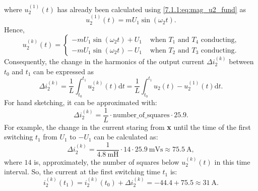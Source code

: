 \begin{solutionblock}
    where $u^{(1)}_\mathrm{2}(t)$ has already been calculated using \eqref{7.1.1:eq:mag_u2_fund} as
    \begin{equation}
        u^{(1)}_\mathrm{2}(t) = m U_{\mathrm{1}} \sin(\omega_2 t).         
    \end{equation}
    Hence,
    \begin{equation}
        u^{(k)}_\mathrm{2}(t) =  \begin{cases}
            - m U_{\mathrm{1}} \sin(\omega_2 t) + U_{\mathrm{1}} &\text{ when $T_1$ and $T_4$ conducting,}\\
            - m U_{\mathrm{1}} \sin(\omega_2 t)  - U_{\mathrm{1}} &\text{ when $T_2$ and $T_3$ conducting}.
            \end{cases}
        \label{7.1.2:eq:u_2_harm_cases}         
    \end{equation}
    Consequently, the change in the harmonics of the output current $\Delta i^{(k)}_\mathrm{2}$ between $t_0$ and $t_1$ can be expressed as 
    \begin{equation}
        \Delta i^{(k)}_\mathrm{2} = \frac{1}{L} \int_{t_0}^{t_1} u^{(k)}_\mathrm{2}(t) \mathrm{d}t = \frac{1}{L} \int_{t_0}^{t_1} u_\mathrm{2}(t) - u^{(1)}_\mathrm{2}(t) \mathrm{d}t.
        \label{7.1.2:eq:i_2_harm}         
    \end{equation}
    For hand sketching, it can be approximated with:
        \begin{equation}
            \Delta i^{(k)}_\mathrm{2} = \frac{1}{L} \cdot \text{number\_of\_squares} \cdot 25.9.
            \label{7.1.2:eq:approx_i_2_harm}         
        \end{equation}
        For example, the change in the current staring from \textbf{x} until the time of the first switching $t_1$ from $U_1$ to $-U_1$ can be calculated as:
        \begin{equation}
            \Delta i^{(k)}_\mathrm{2} = \frac{1}{\SI{4.8}{\milli \henry}} \cdot 14 \cdot \SI{25.9}{\milli \volt \second} \approx \SI{75.5}{\ampere},
            \label{7.1.2:eq:approx_i_2_harm}         
        \end{equation}
        where $14$ is, approximately, the number of squares below $u^{(k)}_\mathrm{2}(t)$ in this time interval. So, the current at the first switching time $t_1$ is:
        \begin{equation}
            i^{(k)}_\mathrm{2}(t_1) = i^{(k)}_\mathrm{2}(t_0) + \Delta i^{(k)}_\mathrm{2} = -44.4 + 75.5 \approx \SI{31}{\ampere}.
            \label{7.1.2:eq:approx_i_2_harm}         
        \end{equation}
\end{solutionblock}
